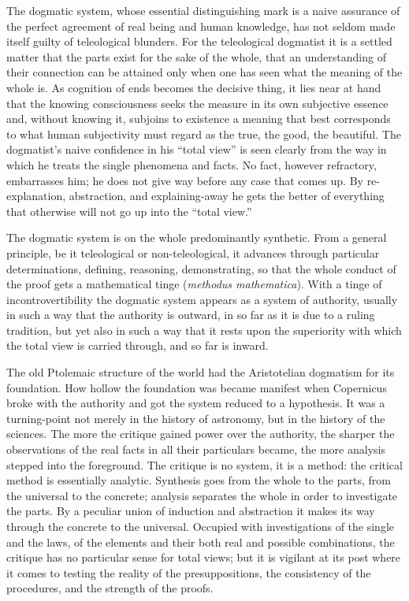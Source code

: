 \documentclass[12pt]{book}
\begin{document}
The dogmatic system, whose essential distinguishing mark is a naive assurance of
the perfect agreement of real being and human knowledge, has not seldom made
itself guilty of teleological blunders. For the teleological dogmatist it is a
settled matter that the parts exist for the sake of the whole, that an
understanding of their connection can be attained only when one has seen what
the meaning of the whole is. As cognition of ends becomes the decisive thing, it
lies near at hand that the knowing consciousness seeks the measure in its own
subjective essence and, without knowing it, subjoins to existence a meaning that
best corresponds to what human subjectivity must regard as the true, the good,
the beautiful. The dogmatist's naive confidence in his ``total view'' is seen
clearly from the way in which he treats the single phenomena and facts. No fact,
however refractory, embarrasses him; he does not give way before any case that
comes up. By re-explanation, abstraction, and explaining-away he gets the better
of everything that otherwise will not go up into the ``total view.''

The dogmatic system is on the whole predominantly synthetic. From a general
principle, be it teleological or non-teleological, it advances through particular
determinations, defining, reasoning, demonstrating, so that the whole conduct of
the proof gets a mathematical tinge (\textit{methodus mathematica}). With a
tinge of incontrovertibility the dogmatic system appears as a system of
authority, usually in such a way that the authority is outward, in so far as it
is due to a ruling tradition, but yet also in such a way that it rests upon the
superiority with which the total view is carried through, and so far is inward.

The old Ptolemaic structure of the world had the Aristotelian dogmatism for its
foundation. How hollow the foundation was became manifest when Copernicus broke
with the authority and got the system reduced to a hypothesis. It was a
turning-point not merely in the history of astronomy, but in the history of the
sciences. The more the critique gained power over the authority, the sharper the
observations of the real facts in all their particulars became, the more
analysis stepped into the foreground. The critique is no system, it is a method:
the critical method is essentially analytic. Synthesis goes from the whole to
the parts, from the universal to the concrete; analysis separates the whole in
order to investigate the parts. By a peculiar union of induction and abstraction
it makes its way through the concrete to the universal. Occupied with
investigations of the single and the laws, of the elements and their both real
and possible combinations, the critique has no particular sense for total views;
but it is vigilant at its post where it comes to testing the reality of the
presuppositions, the consistency of the procedures, and the strength of the
proofs.
\end{document}
